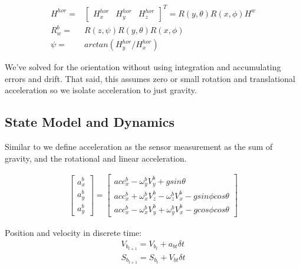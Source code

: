 \documentclass[conference]{IEEEtran}
\begin{document}
\begin{align}
H^{hor} =& \begin{bmatrix} H_x^{hor}& H_y^{hor}& H_{z}^{hor}\end{bmatrix}^T = R(y, \theta) R(x, \phi) H^w \nonumber \\
R_w^b =& R(z, \psi) R(y, \theta) R(x, \phi)\\
\psi =& arctan(H_y^{hor} / H_x^{hor})\label{eq:yaw}
\end{align}

We've solved for the orientation without using integration and accumulating errors and drift. That said, this assumes zero or small rotation and translational acceleration so we isolate acceleration to just gravity.

\subsection{State Model and Dynamics}

Similar to \cite{b19} we define acceleration as the sensor measurement as the sum of gravity, and the rotational and linear acceleration.

\begin{align}
\begin{bmatrix} a_x^b\\ a_y^b\\ a_y^b\end{bmatrix} = \begin{bmatrix} acc_x^b - \omega_y^b V_y^b + g sin \theta\\
													  acc_x^b + \omega_x^b V_z^b - \omega_z^b V_x^b - g sin \phi cos \theta \\
													  acc_x^b - \omega_x^b V_y^b + \omega_y^b V_x^b - g cos \phi cos \theta\end{bmatrix}
\end{align}

Position and velocity in discrete time:
\begin{align}
V_{b_{t+1}} = V_{b_{t}} + a_{bt} \delta t\\
S_{b_{t+1}} = S_{b_{t}} + V_{bt} \delta t
\end{align}
\end{document}
